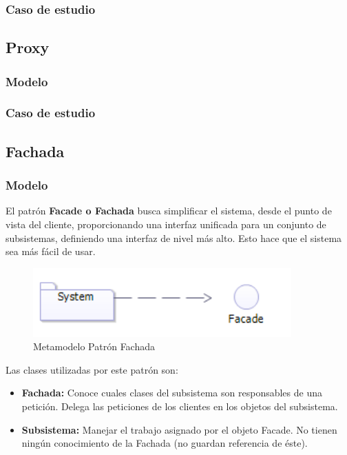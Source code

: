 \subsubsection{Caso de estudio}
\newpage

\subsection{Proxy}
\subsubsection{Modelo}
\newpage
\subsubsection{Caso de estudio}
\newpage

\subsection{Fachada}
\subsubsection{Modelo}

El patrón \textbf{Facade o Fachada} busca simplificar el sistema, desde el punto de vista del cliente, proporcionando una interfaz unificada para un conjunto de subsistemas, definiendo una interfaz de nivel más alto. Esto hace que el sistema sea más fácil de usar.

\begin{figure}[th!]
	\centering
	\includegraphics[width=0.6\linewidth]{arquitectura/imagenes/modeloFachada}
	\caption{Metamodelo Patrón Fachada}
	\label{fig:metamodelo patron fachada}
\end{figure}


Las clases utilizadas por este patrón son:
\begin{itemize}
	\item \textbf{Fachada: }Conoce cuales clases del subsistema son responsables de una petición. Delega las peticiones de los clientes en los objetos del subsistema.
	\item \textbf{Subsistema: }Manejar el trabajo asignado por el objeto Facade. No tienen ningún conocimiento de la Fachada (no guardan referencia de éste).
\end{itemize}


